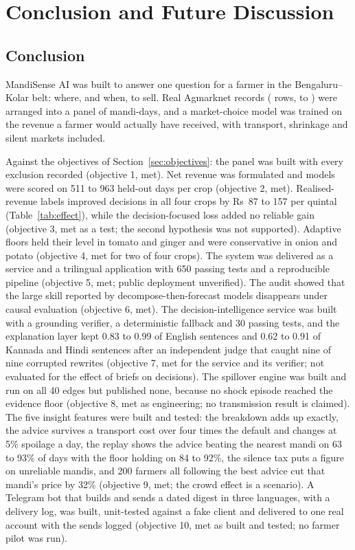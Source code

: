 \chapter{Conclusion and Future Discussion}
\label{ch:concl}

\section{Conclusion}
\label{sec:conclusion}

MandiSense AI was built to answer one question for a farmer in the Bengaluru--Kolar belt: where, and when, to sell. Real Agmarknet records (\NhistoryRows{} rows, \DataFrom{} to \DataTo{}) were arranged into a panel of \NpanelRows{} mandi-days, and a market-choice model was trained on the revenue a farmer would actually have received, with transport, shrinkage and silent markets included.

Against the objectives of Section~\ref{sec:objectives}: the panel was built with every exclusion recorded (objective 1, met). Net revenue was formulated and models were scored on 511 to 963 held-out days per crop (objective 2, met). Realised-revenue labels improved decisions in all four crops by Rs~87 to 157 per quintal (Table~\ref{tab:effect}), while the decision-focused loss added no reliable gain (objective 3, met as a test; the second hypothesis was not supported). Adaptive floors held their level in tomato and ginger and were conservative in onion and potato (objective 4, met for two of four crops). The system was delivered as a service and a trilingual application with 650 passing tests and a reproducible pipeline (objective 5, met; public deployment unverified). The audit showed that the large skill reported by decompose-then-forecast models disappears under causal evaluation (objective 6, met). The decision-intelligence service was built with a grounding verifier, a deterministic fallback and 30 passing tests, and the explanation layer kept 0.83 to 0.99 of English sentences and 0.62 to 0.91 of Kannada and Hindi sentences after an independent judge that caught nine of nine corrupted rewrites (objective 7, met for the service and its verifier; not evaluated for the effect of briefs on decisions). The spillover engine was built and run on all 40 edges but published none, because no shock episode reached the evidence floor (objective 8, met as engineering; no transmission result is claimed). The five insight features were built and tested: the breakdown adds up exactly, the advice survives a transport cost over four times the default and changes at 5\% spoilage a day, the replay shows the advice beating the nearest mandi on 63 to 93\% of days with the floor holding on 84 to 92\%, the silence tax puts a figure on unreliable mandis, and 200 farmers all following the best advice cut that mandi's price by 32\% (objective 9, met; the crowd effect is a scenario). A Telegram bot that builds and sends a dated digest in three languages, with a delivery log, was built, unit-tested against a fake client and delivered to one real account with the sends logged (objective 10, met as built and tested; no farmer pilot was run).

